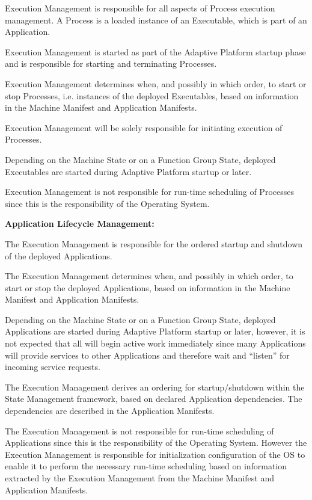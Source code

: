 \begin{DoxyItemize}
\item Execution Management is responsible for all aspects of Process execution management. A Process is a loaded instance of an Executable, which is part of an Application.
\item Execution Management is started as part of the Adaptive Platform startup phase and is responsible for starting and terminating Processes.
\item Execution Management determines when, and possibly in which order, to start or stop Processes, i.\+e. instances of the deployed Executables, based on information in the Machine Manifest and Application Manifests.
\item Execution Management will be solely responsible for initiating execution of Processes.
\item Depending on the Machine State or on a Function Group State, deployed Executables are started during Adaptive Platform startup or later.
\item Execution Management is not responsible for run-\/time scheduling of Processes since this is the responsibility of the Operating System.
\item {\bfseries Application Lifecycle Management\+:}
\begin{DoxyItemize}
\item The Execution Management is responsible for the ordered startup and shutdown of the deployed Applications.
\item The Execution Management determines when, and possibly in which order, to start or stop the deployed Applications, based on information in the Machine Manifest and Application Manifests.
\item Depending on the Machine State or on a Function Group State, deployed Applications are started during Adaptive Platform startup or later, however, it is not expected that all will begin active work immediately since many Applications will provide services to other Applications and therefore wait and “listen” for incoming service requests.
\item The Execution Management derives an ordering for startup/shutdown within the State Management framework, based on declared Application dependencies. The dependencies are described in the Application Manifests.
\end{DoxyItemize}
\item The Execution Management is not responsible for run-\/time scheduling of Applications since this is the responsibility of the Operating System. However the Execution Management is responsible for initialization configuration of the OS to enable it to perform the necessary run-\/time scheduling based on information extracted by the Execution Management from the Machine Manifest and Application Manifests.
\end{DoxyItemize}

